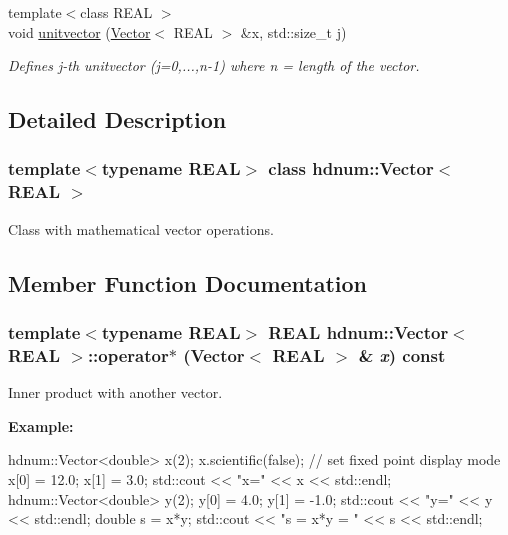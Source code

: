 \begin{DoxyCompactItemize}
{\footnotesize template$<$class REAL $>$ }\\void \hyperlink{classhdnum_1_1Vector_a99ec4439cc5942afee540708022372e7}{unitvector} (\hyperlink{classhdnum_1_1Vector}{Vector}$<$ REAL $>$ \&x, std::size\_\-t j)
\begin{DoxyCompactList}\small\item\em Defines j-\/th unitvector (j=0,...,n-\/1) where n = length of the vector. \item\end{DoxyCompactList}\end{DoxyCompactItemize}


\subsection{Detailed Description}
\subsubsection*{template$<$typename REAL$>$ class hdnum::Vector$<$ REAL $>$}

Class with mathematical vector operations. 

\subsection{Member Function Documentation}
\hypertarget{classhdnum_1_1Vector_aef63f9bb0fd5490d989317559ab5417e}{
\subsubsection[{operator$\ast$}]{\setlength{\rightskip}{0pt plus 5cm}template$<$typename REAL$>$ REAL {\bf hdnum::Vector}$<$ REAL $>$::operator$\ast$ ({\bf Vector}$<$ REAL $>$ \& {\em x}) const}}
\label{classhdnum_1_1Vector_aef63f9bb0fd5490d989317559ab5417e}


Inner product with another vector. 

{\bfseries Example:} 
\begin{DoxyCode}
hdnum::Vector<double> x(2);
x.scientific(false); // set fixed point display mode
x[0] = 12.0;
x[1] = 3.0;
std::cout << "x=" << x << std::endl;
hdnum::Vector<double> y(2);
y[0] = 4.0;
y[1] = -1.0;
std::cout << "y=" << y << std::endl;
double s = x*y;
std::cout << "s = x*y = " << s << std::endl;
\end{DoxyCode}


